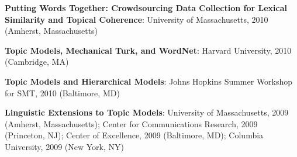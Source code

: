 \documentclass[10pt,a4paper]{article} %
\begin{document}
{\begin{enumerate*}
	\item {\bf Putting Words Together: Crowdsourcing Data Collection for Lexical Similarity and Topical Coherence}: University of Massachusetts, 2010 (Amherst, Massachusetts)
	\item {\bf Topic Models, Mechanical Turk, and WordNet}: Harvard University, 2010 (Cambridge, MA)
	\item {\bf Topic Models and Hierarchical Models}: Johns Hopkins Summer Workshop for SMT, 2010 (Baltimore, MD)
	\item {\bf Linguistic Extensions to Topic Models}: University of Massachusetts, 2009 (Amherst, Massachusetts); Center for Communications Research, 2009 (Princeton, NJ); Center of Excellence, 2009 (Baltimore, MD); Columbia University, 2009 (New York, NY)
\end{enumerate*}

}

\end{document}
